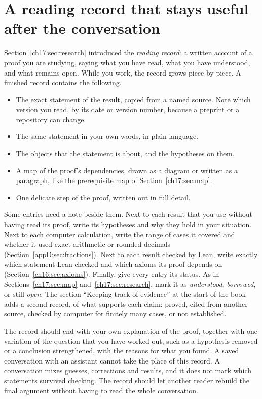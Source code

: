 \section{A reading record that stays useful after the conversation}\label{appE:sec:record}
Section~\ref{ch17:sec:research} introduced the \emph{reading record}: a written account of a proof you are studying, saying what you have read, what you have understood, and what remains open. While you work, the record grows piece by piece. A finished record contains the following.
\begin{itemize}
\item The exact statement of the result, copied from a named source. Note which version you read, by its date or version number, because a preprint or a repository can change.
\item The same statement in your own words, in plain language.
\item The objects that the statement is about, and the hypotheses on them.
\item A map of the proof's dependencies, drawn as a diagram or written as a paragraph, like the prerequisite map of Section~\ref{ch17:sec:map}.
\item One delicate step of the proof, written out in full detail.
\end{itemize}

Some entries need a note beside them. Next to each result that you use without having read its proof, write its hypotheses and why they hold in your situation. Next to each computer calculation, write the range of cases it covered and whether it used exact arithmetic or rounded decimals (Section~\ref{appD:sec:fractions}). Next to each result checked by Lean, write exactly which statement Lean checked and which axioms its proof depends on (Section~\ref{ch16:sec:axioms}). Finally, give every entry its status. As in Sections~\ref{ch17:sec:map} and~\ref{ch17:sec:research}, mark it as \emph{understood}, \emph{borrowed}, or still \emph{open}. The section ``Keeping track of evidence'' at the start of the book adds a second record, of what supports each claim: proved, cited from another source, checked by computer for finitely many cases, or not established.

The record should end with your own explanation of the proof, together with one variation of the question that you have worked out, such as a hypothesis removed or a conclusion strengthened, with the reasons for what you found. A saved conversation with an assistant cannot take the place of this record. A conversation mixes guesses, corrections and results, and it does not mark which statements survived checking. The record should let another reader rebuild the final argument without having to read the whole conversation.
